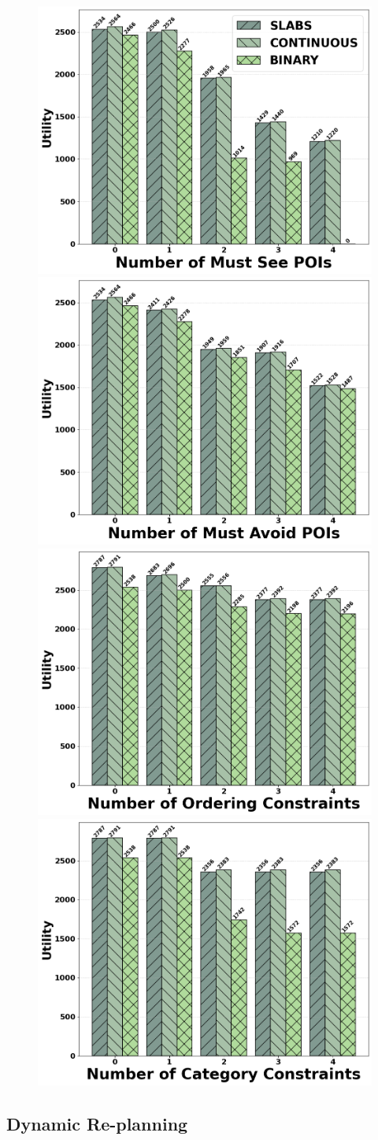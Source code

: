 \begin{figure}[t]
\centering
\includegraphics[width=0.48\columnwidth]{plots/mustsee.png}
\includegraphics[width=0.48\columnwidth]{plots/mustavoid.png}
\includegraphics[width=0.48\columnwidth]{plots/ordering.png}
\includegraphics[width=0.48\columnwidth]{plots/category.png}
\label{fig:personalizedconstraints}
\end{figure}

\subsection{Dynamic Re-planning}

